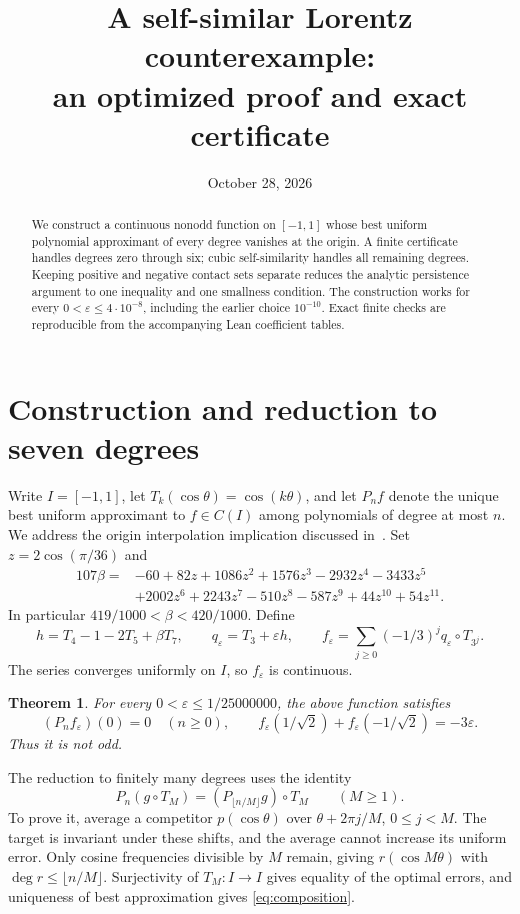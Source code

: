 \documentclass[11pt]{article}
\title{A self-similar Lorentz counterexample:\\an optimized proof and exact certificate}
\author{}
\date{October 28, 2026}
\newtheorem{theorem}{Theorem}
\begin{document}
\maketitle
\begin{abstract}
We construct a continuous nonodd function on $[-1,1]$ whose best uniform
polynomial approximant of every degree vanishes at the origin. A finite
certificate handles degrees zero through six; cubic self-similarity handles
all remaining degrees. Keeping positive and negative contact sets separate
reduces the analytic persistence argument to one inequality and one smallness
condition. The construction works for every $0<\varepsilon\le 4\cdot10^{-8}$,
including the earlier choice $10^{-10}$. Exact finite checks are reproducible
from the accompanying Lean coefficient tables.
\end{abstract}

\section{Construction and reduction to seven degrees}
Write $I=[-1,1]$, let $T_k(\cos\theta)=\cos(k\theta)$, and let $P_n f$ denote
the unique best uniform approximant to $f\in C(I)$ among polynomials of degree
at most $n$. We address the origin interpolation implication discussed
in~\cite{sv}. Set $z=2\cos(\pi/36)$ and
\begin{align*}
107\beta={}&-60+82z+1086z^2+1576z^3-2932z^4-3433z^5\\
 &+2002z^6+2243z^7-510z^8-587z^9+44z^{10}+54z^{11}.
\end{align*}
In particular $419/1000<\beta<420/1000$. Define
\[
 h=T_4-1-2T_5+\beta T_7,\qquad q_\varepsilon=T_3+\varepsilon h,
 \qquad f_\varepsilon=\sum_{j\ge0}(-1/3)^j q_\varepsilon\circ T_{3^j}.
\]
The series converges uniformly on $I$, so $f_\varepsilon$ is continuous.

\begin{theorem}\label{thm:main}
For every $0<\varepsilon\le 1/25000000$, the above function satisfies
\[
 (P_n f_\varepsilon)(0)=0\quad(n\ge0),\qquad
 f_\varepsilon(1/\sqrt2)+f_\varepsilon(-1/\sqrt2)=-3\varepsilon.
\]
Thus it is not odd.
\end{theorem}

The reduction to finitely many degrees uses the identity
\begin{equation}\label{eq:composition}
 P_n(g\circ T_M)=(P_{\lfloor n/M\rfloor}g)\circ T_M\qquad(M\ge1).
\end{equation}
To prove it, average a competitor $p(\cos\theta)$ over
$\theta+2\pi j/M$, $0\le j<M$. The target is invariant under these shifts,
and the average cannot increase its uniform error. Only cosine frequencies
divisible by $M$ remain, giving $r(\cos M\theta)$ with
$\deg r\le\lfloor n/M\rfloor$. Surjectivity of $T_M:I\to I$ gives equality
of the optimal errors, and uniqueness of best approximation gives
\eqref{eq:composition}.
\end{document}
